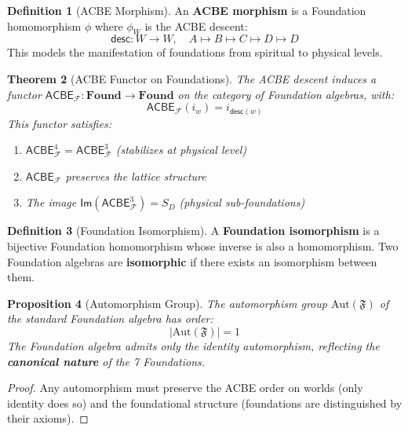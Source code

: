 \documentclass[11pt,twoside,openright]{book}
\theoremstyle{definition}
\newtheorem{definition}{Definition}[chapter]
\theoremstyle{plain}
\newtheorem{theorem}[definition]{Theorem}
\newtheorem{proposition}[definition]{Proposition}
\theoremstyle{remark}
\newcommand{\Foundations}{\mathcal{F}}
\begin{document}
\begin{definition}[ACBE Morphism]
\label{def:acbe-morphism}
An \textbf{ACBE morphism} is a Foundation homomorphism $\phi$ where $\phi_W$ is the ACBE descent:
\[
\mathsf{desc} : W \to W, \quad A \mapsto B \mapsto C \mapsto D \mapsto D
\]
This models the manifestation of foundations from spiritual to physical levels.
\end{definition}

\begin{theorem}[ACBE Functor on Foundations]
\label{thm:acbe-foundation-functor}
The ACBE descent induces a functor $\mathsf{ACBE}_\Foundations : \mathbf{Found} \to \mathbf{Found}$ on the category of Foundation algebras, with:
\[
\mathsf{ACBE}_\Foundations(i_w) = i_{\mathsf{desc}(w)}
\]
This functor satisfies:
\begin{enumerate}[label=(\roman*)]
  \item $\mathsf{ACBE}_\Foundations^4 = \mathsf{ACBE}_\Foundations^3$ (stabilizes at physical level)
  \item $\mathsf{ACBE}_\Foundations$ preserves the lattice structure
  \item The image $\mathsf{Im}(\mathsf{ACBE}_\Foundations^3) = S_D$ (physical sub-foundations)
\end{enumerate}
\end{theorem}

\begin{definition}[Foundation Isomorphism]
\label{def:foundation-isomorphism}
A \textbf{Foundation isomorphism} is a bijective Foundation homomorphism whose inverse is also a homomorphism. Two Foundation algebras are \textbf{isomorphic} if there exists an isomorphism between them.
\end{definition}

\begin{proposition}[Automorphism Group]
\label{prop:foundation-automorphisms}
The automorphism group $\mathrm{Aut}(\mathfrak{F})$ of the standard Foundation algebra has order:
\[
|\mathrm{Aut}(\mathfrak{F})| = 1
\]
The Foundation algebra admits only the identity automorphism, reflecting the \textbf{canonical nature} of the 7 Foundations.
\end{proposition}

\begin{proof}
Any automorphism must preserve the ACBE order on worlds (only identity does so) and the foundational structure (foundations are distinguished by their axioms).
\end{proof}
\end{document}
